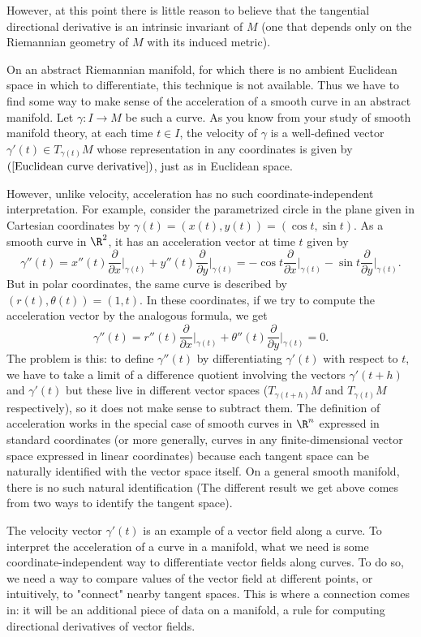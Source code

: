However, at this point there is little reason to believe that the tangential directional derivative is an intrinsic invariant of $M$ (one that depends only on the Riemannian geometry of $M$ with its induced metric).\par
On an abstract Riemannian manifold, for which there is no ambient Euclidean space in which to differentiate, this technique is not available. Thus we have to find some way to make sense of the acceleration of a smooth curve in an abstract manifold. Let $\gamma:I\to M$ be 
such a curve. As you know from your study of smooth manifold theory, at each time $t\in I$, the velocity of $\gamma$ is a well-defined vector $\gamma'(t)\in T_{\gamma(t)}M$ whose representation in any coordinates is given by $(\ref{Euclidean curve derivative})$, just as in Euclidean space.\par
However, unlike velocity, acceleration has no such coordinate-independent interpretation. For example, consider the parametrized circle in the plane given in Cartesian coordinates by $\gamma(t)=(x(t),y(t))=(\cos t,\sin t)$. As a smooth curve in $\R^2$, it has an acceleration vector at time $t$ given by
\[\gamma''(t)=x''(t)\frac{\partial}{\partial x}\Big|_{\gamma(t)}+y''(t)\frac{\partial}{\partial y}\Big|_{\gamma(t)}=-\cos t\frac{\partial}{\partial x}\Big|_{\gamma(t)}-\sin t\frac{\partial}{\partial y}\Big|_{\gamma(t)}.\]
But in polar coordinates, the same curve is described by $(r(t),\theta(t))=(1,t)$. In these coordinates, if we try to compute the acceleration vector by the analogous formula, we get
\[\gamma''(t)=r''(t)\frac{\partial}{\partial x}\Big|_{\gamma(t)}+\theta''(t)\frac{\partial}{\partial y}\Big|_{\gamma(t)}=0.\]
The problem is this: to define $\gamma''(t)$ by differentiating $\gamma'(t)$ with respect to $t$, we have to take a limit of a difference quotient involving the vectors $\gamma'(t+h)$ and $\gamma'(t)$ but these live in different vector spaces ($T_{\gamma(t+h)}M$ and $T_{\gamma(t)}M$ respectively), so it does not make sense to subtract them. The definition of acceleration works in the special case of smooth curves in $\R^n$ expressed in standard coordinates (or more generally, curves in any finite-dimensional vector space expressed in linear coordinates) because each tangent space can be naturally identified with the vector space itself. On a general smooth manifold, there is no such natural identification (The different result we get above comes from two ways to identify the tangent space).\par
The velocity vector $\gamma'(t)$ is an example of a vector field along a curve. To interpret the acceleration of a curve in a manifold, what we need is some coordinate-independent way to differentiate vector fields along curves. To do so, we need a way to compare values of the vector field at different points, or intuitively, to "connect" nearby tangent spaces. This is where a connection comes in: it will be an additional piece of data on a manifold, a rule for computing directional derivatives of vector fields.
